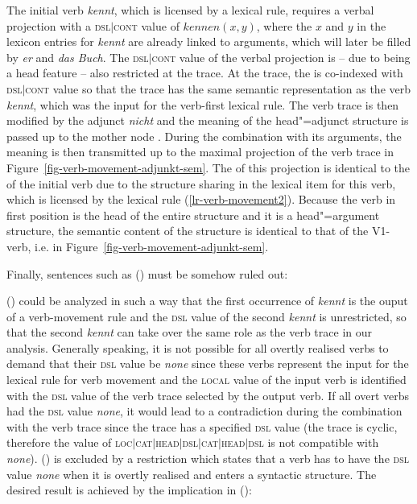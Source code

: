 {{The initial verb \emph{kennt}, which is licensed by a lexical rule, requires a verbal projection
with a \textsc{dsl$|$cont} value of
$kennen(x, y)$, where the $x$ and $y$ in the lexicon entries for \emph{kennt} are already linked to arguments, which will later be
filled by \emph{er} and \emph{das Buch}. The \textsc{dsl$|$cont} value of the verbal projection is -- due to \dsl being a head feature -- also
restricted at the trace. At the trace, the \contv{} is co-indexed with \textsc{dsl$|$cont} value so that the trace has the same semantic representation
as the verb \emph{kennt}, which was the input for the verb-first lexical rule. The verb trace is then modified by the adjunct \emph{nicht} 
and the meaning of the head"=adjunct structure is passed up to the mother node . During the combination with its arguments, the 
meaning is then transmitted up to the maximal projection of the verb trace in Figure~\ref{fig-verb-movement-adjunkt-sem}. The \contv of this
projection is identical to the \contv of the initial verb due to the structure sharing in the lexical item for this verb, which is licensed by the lexical 
rule (\ref{lr-verb-movement2}). Because the verb in first position is the head of the entire structure and it is a head"=argument structure, the semantic
content of the structure is identical to that of the V1-verb, i.e.  in Figure~\ref{fig-verb-movement-adjunkt-sem}.

Finally, sentences such as () must be somehow ruled out:
\z


() could be analyzed in such a way that the first occurrence of \emph{kennt} is the ouput of a verb-movement rule
and the \textsc{dsl} value of the second \emph{kennt} is unrestricted, so that the second \emph{kennt} can take over the 
same role as the verb trace in our analysis. Generally speaking, it is not possible for all overtly realised verbs to demand that
their  \textsc{dsl} value be \emph{none} since these verbs represent the input for the lexical rule for verb movement and
the \textsc{local} value of the input verb is identified with the \textsc{dsl} value of the verb trace selected by the output verb.
If all overt verbs had the \textsc{dsl} value \emph{none}, it would lead to a contradiction during the combination with the verb
trace since the trace has a specified \textsc{dsl} value (the trace is cyclic, therefore the value of \textsc{loc$|$cat$|$\-head$|$\-dsl$|$\-cat$|$\-head$|$\-dsl}
is not compatible with \emph{none}).
() is excluded by a restriction which states that a verb has to have the \textsc{dsl} value \emph{none} when it is
overtly realised and enters a syntactic structure. The desired result is achieved by the implication in ():

}}
